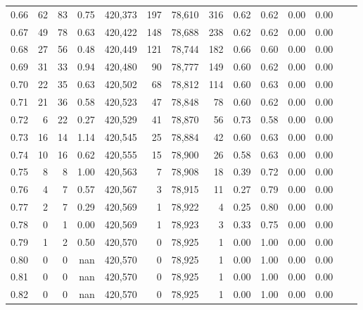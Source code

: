\begin{tabular}{rrrrrrrrrrrrrr}
0.66 &      62 &     83 &    0.75 &  420,373 &      197 &  78,610 &     316 &  0.62 &  0.62 &  0.00 &      0.00 \\
0.67 &      49 &     78 &    0.63 &  420,422 &      148 &  78,688 &     238 &  0.62 &  0.62 &  0.00 &      0.00 \\
0.68 &      27 &     56 &    0.48 &  420,449 &      121 &  78,744 &     182 &  0.66 &  0.60 &  0.00 &      0.00 \\
0.69 &      31 &     33 &    0.94 &  420,480 &       90 &  78,777 &     149 &  0.60 &  0.62 &  0.00 &      0.00 \\
0.70 &      22 &     35 &    0.63 &  420,502 &       68 &  78,812 &     114 &  0.60 &  0.63 &  0.00 &      0.00 \\
0.71 &      21 &     36 &    0.58 &  420,523 &       47 &  78,848 &      78 &  0.60 &  0.62 &  0.00 &      0.00 \\
0.72 &       6 &     22 &    0.27 &  420,529 &       41 &  78,870 &      56 &  0.73 &  0.58 &  0.00 &      0.00 \\
0.73 &      16 &     14 &    1.14 &  420,545 &       25 &  78,884 &      42 &  0.60 &  0.63 &  0.00 &      0.00 \\
0.74 &      10 &     16 &    0.62 &  420,555 &       15 &  78,900 &      26 &  0.58 &  0.63 &  0.00 &      0.00 \\
0.75 &       8 &      8 &    1.00 &  420,563 &        7 &  78,908 &      18 &  0.39 &  0.72 &  0.00 &      0.00 \\
0.76 &       4 &      7 &    0.57 &  420,567 &        3 &  78,915 &      11 &  0.27 &  0.79 &  0.00 &      0.00 \\
0.77 &       2 &      7 &    0.29 &  420,569 &        1 &  78,922 &       4 &  0.25 &  0.80 &  0.00 &      0.00 \\
0.78 &       0 &      1 &    0.00 &  420,569 &        1 &  78,923 &       3 &  0.33 &  0.75 &  0.00 &      0.00 \\
0.79 &       1 &      2 &    0.50 &  420,570 &        0 &  78,925 &       1 &  0.00 &  1.00 &  0.00 &      0.00 \\
0.80 &       0 &      0 &     nan &  420,570 &        0 &  78,925 &       1 &  0.00 &  1.00 &  0.00 &      0.00 \\
0.81 &       0 &      0 &     nan &  420,570 &        0 &  78,925 &       1 &  0.00 &  1.00 &  0.00 &      0.00 \\
0.82 &       0 &      0 &     nan &  420,570 &        0 &  78,925 &       1 &  0.00 &  1.00 &  0.00 &      0.00 \\

\end{tabular}

